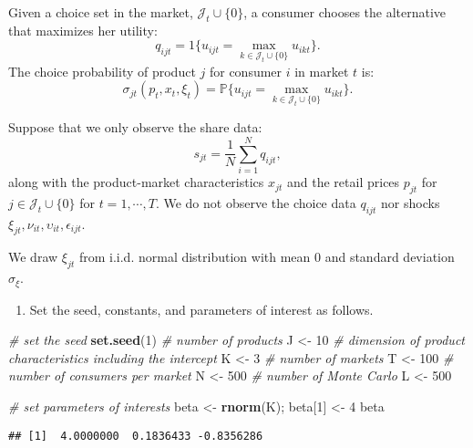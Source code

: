 \documentclass[
]{book}
\newenvironment{Shaded}{\begin{snugshade}}{\end{snugshade}}
\newcommand{\CommentTok}[1]{\textcolor[rgb]{0.56,0.35,0.01}{\textit{#1}}}
\newcommand{\DecValTok}[1]{\textcolor[rgb]{0.00,0.00,0.81}{#1}}
\newcommand{\KeywordTok}[1]{\textcolor[rgb]{0.13,0.29,0.53}{\textbf{#1}}}
\newcommand{\NormalTok}[1]{#1}
\newcommand{\StringTok}[1]{\textcolor[rgb]{0.31,0.60,0.02}{#1}}
\providecommand{\tightlist}{%
  \setlength{\itemsep}{0pt}\setlength{\parskip}{0pt}}
\begin{document}
Given a choice set in the market, \(\mathcal{J}_t \cup \{0\}\), a consumer chooses the alternative that maximizes her utility:
\[
q_{ijt} = 1\{u_{ijt} = \max_{k \in \mathcal{J}_t \cup \{0\}} u_{ikt}\}.
\]
The choice probability of product \(j\) for consumer \(i\) in market \(t\) is:
\[
\sigma_{jt}(p_t, x_t, \xi_t) = \mathbb{P}\{u_{ijt} = \max_{k \in \mathcal{J}_t \cup \{0\}} u_{ikt}\}.
\]

Suppose that we only observe the share data:
\[
s_{jt} = \frac{1}{N} \sum_{i = 1}^N q_{ijt},
\]
along with the product-market characteristics \(x_{jt}\) and the retail prices \(p_{jt}\) for \(j \in \mathcal{J}_t \cup \{0\}\) for \(t = 1, \cdots, T\). We do not observe the choice data \(q_{ijt}\) nor shocks \(\xi_{jt}, \nu_{it}, \upsilon_{it}, \epsilon_{ijt}\).

We draw \(\xi_{jt}\) from i.i.d. normal distribution with mean 0 and standard deviation \(\sigma_{\xi}\).

\begin{enumerate}
\def\labelenumi{\arabic{enumi}.}
\tightlist
\item
  Set the seed, constants, and parameters of interest as follows.
\end{enumerate}

\begin{Shaded}
\begin{Highlighting}[]
\CommentTok{# set the seed}
\KeywordTok{set.seed}\NormalTok{(}\DecValTok{1}\NormalTok{)}
\CommentTok{# number of products}
\NormalTok{J <-}\StringTok{ }\DecValTok{10}
\CommentTok{# dimension of product characteristics including the intercept}
\NormalTok{K <-}\StringTok{ }\DecValTok{3}
\CommentTok{# number of markets}
\NormalTok{T <-}\StringTok{ }\DecValTok{100}
\CommentTok{# number of consumers per market}
\NormalTok{N <-}\StringTok{ }\DecValTok{500}
\CommentTok{# number of Monte Carlo}
\NormalTok{L <-}\StringTok{ }\DecValTok{500}
\end{Highlighting}
\end{Shaded}

\begin{Shaded}
\begin{Highlighting}[]
\CommentTok{# set parameters of interests}
\NormalTok{beta <-}\StringTok{ }\KeywordTok{rnorm}\NormalTok{(K); }
\NormalTok{beta[}\DecValTok{1}\NormalTok{] <-}\StringTok{ }\DecValTok{4}
\NormalTok{beta}
\end{Highlighting}
\end{Shaded}

\begin{verbatim}
## [1]  4.0000000  0.1836433 -0.8356286
\end{verbatim}
\end{document}
